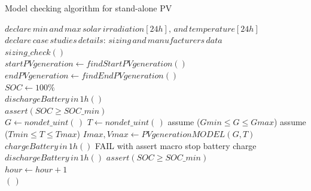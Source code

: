 \documentclass[review]{elsarticle}
\begin{document}
 \begin{algorithm}
 \caption{Model checking algorithm for stand-alone PV}
 \begin{algorithmic}[1]
 \begin{scriptsize}
 \renewcommand{\algorithmicrequire}{\textbf{Input:}}
 \renewcommand{\algorithmicensure}{\textbf{Output:}}
  \STATE $declare \, min \, and \, max \, solar \, irradiation[24h], \, and \, temperature[24h]$\\
  \STATE $declare \, case \, studies \, details: \, sizing \, and \, manufacturers \, data $ \\
  \STATE $sizing \_ check()$ \\
  \STATE $startPVgeneration \leftarrow findStartPVgeneration()$ \\
  \STATE $endPVgeneration \leftarrow findEndPVgeneration()$ \\
  \STATE $SOC \leftarrow 100\%$ \\
	  \STATE $dischargeBattery \, in \, 1h()$ \\
	  \STATE $assert (SOC \geq SOC \_ min)$ \\
  \ENDFOR
    \STATE $G \leftarrow nondet \_ uint(\,)$ 
    \STATE $T \leftarrow nondet \_ uint(\,)$ 
    \STATE assume ($Gmin \leq G \leq Gmax$) 
    \STATE assume ($Tmin \leq T \leq Tmax$) 
    \STATE $Imax, Vmax \leftarrow PVgenerationMODEL (G,T)$ \\
      \STATE $chargeBattery \, in \, 1h()$ 
      \STATE FAIL with assert macro 
      \STATE stop battery charge 
      \STATE $dischargeBattery \, in \, 1h()$ 
    \ENDIF
    \STATE $assert (SOC \geq SOC \_ min)$ \\
    \STATE $hour \leftarrow hour+1$ \\
   \ENDFOR
  \ENDFOR
 \RETURN $(\,)$ 
  \end{scriptsize}
 \end{algorithmic} 
 \label{alg:verification-algorithm}
 \end{algorithm}
\end{document}
